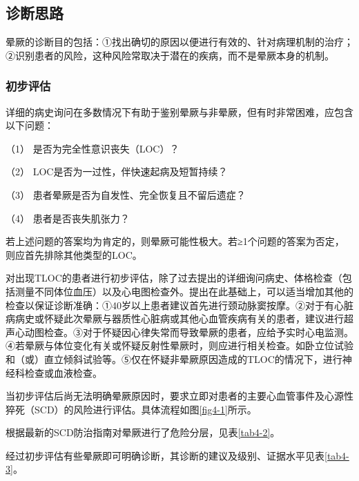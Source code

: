 \subsection{诊断思路}

晕厥的诊断目的包括：①找出确切的原因以便进行有效的、针对病理机制的治疗；②识别患者的风险，这种风险常取决于潜在的疾病，而不是晕厥本身的机制。

\subsubsection{初步评估}

详细的病史询问在多数情况下有助于鉴别晕厥与非晕厥，但有时非常困难，应包含以下问题：

（1） 是否为完全性意识丧失（LOC）？

（2） LOC是否为一过性，伴快速起病及短暂持续？

（3） 患者晕厥是否为自发性、完全恢复且不留后遗症？

（4） 患者是否丧失肌张力？

若上述问题的答案均为肯定的，则晕厥可能性极大。若≥1个问题的答案为否定，则应首先排除其他类型的LOC。

对出现TLOC的患者进行初步评估，除了过去提出的详细询问病史、体格检查（包括测量不同体位血压）以及心电图检查外。提出在此基础上，可以适当增加其他的检查以保证诊断准确：①40岁以上患者建议首先进行颈动脉窦按摩。②对于有心脏病病史或怀疑此次晕厥与器质性心脏病或其他心血管疾病有关的患者，建议进行超声心动图检查。③对于怀疑因心律失常而导致晕厥的患者，应给予实时心电监测。④若晕厥与体位变化有关或怀疑反射性晕厥时，则应进行相关检查。如卧立位试验和（或）直立倾斜试验等。⑤仅在怀疑非晕厥原因造成的TLOC的情况下，进行神经科检查或血液检查。

当初步评估后尚无法明确晕厥原因时，要求立即对患者的主要心血管事件及心源性猝死（SCD）的风险进行评估。具体流程如图\ref{fig4-1}所示。

根据最新的SCD防治指南对晕厥进行了危险分层，见表\ref{tab4-2}。

经过初步评估有些晕厥即可明确诊断，其诊断的建议及级别、证据水平见表\ref{tab4-3}。

